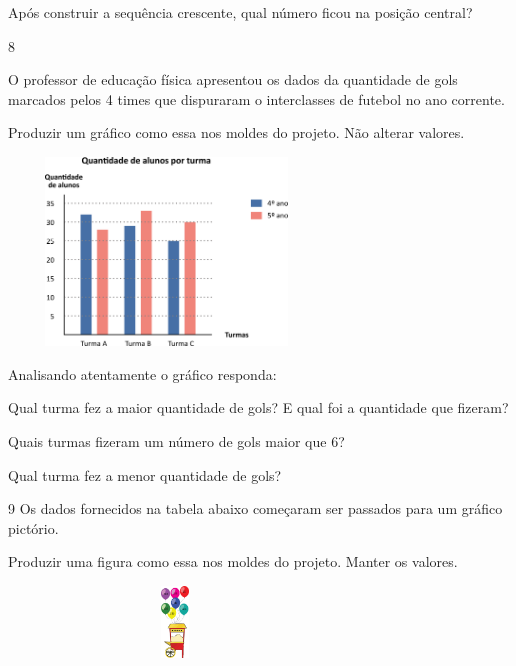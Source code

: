 \begin{escolha}
\begin{escolha}
\begin{escolha}
\item
  Após construir a sequência crescente, qual número ficou na posição
  central?
\end{escolha}

\num{8}

O professor de educação física apresentou os dados da quantidade de gols
marcados pelos 4 times que dispuraram o interclasses de futebol no ano
corrente.

Produzir um gráfico como essa nos moldes do projeto. Não alterar
valores.

\includegraphics[width=3.30769in,height=1.97201in]{media/image97.png}

Analisando atentamente o gráfico responda:

\begin{escolha}

\item
  Qual turma fez a maior quantidade de gols? E qual foi a quantidade que
  fizeram?

\item
  Quais turmas fizeram um número de gols maior que 6?

\item
  Qual turma fez a menor quantidade de gols?
\end{escolha}

\num{9} Os dados fornecidos na tabela abaixo começaram ser passados para um
gráfico pictório.

Produzir uma figura como essa nos moldes do projeto. Manter os valores.

\includegraphics[width=3.47436in,height=0.75022in]{media/image98.png}


\end{escolha}
\end{escolha}
